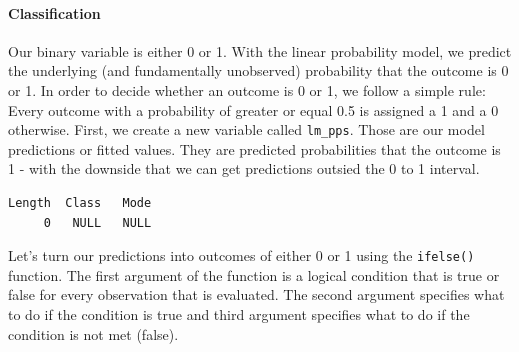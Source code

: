 \documentclass[]{article}
\newenvironment{Shaded}{\begin{snugshade}}{\end{snugshade}}
\newcommand{\KeywordTok}[1]{\textcolor[rgb]{0.13,0.29,0.53}{\textbf{#1}}}
\newcommand{\DataTypeTok}[1]{\textcolor[rgb]{0.13,0.29,0.53}{#1}}
\newcommand{\DecValTok}[1]{\textcolor[rgb]{0.00,0.00,0.81}{#1}}
\newcommand{\FloatTok}[1]{\textcolor[rgb]{0.00,0.00,0.81}{#1}}
\newcommand{\StringTok}[1]{\textcolor[rgb]{0.31,0.60,0.02}{#1}}
\newcommand{\CommentTok}[1]{\textcolor[rgb]{0.56,0.35,0.01}{\textit{#1}}}
\newcommand{\OperatorTok}[1]{\textcolor[rgb]{0.81,0.36,0.00}{\textbf{#1}}}
\newcommand{\NormalTok}[1]{#1}
\let\oldparagraph\paragraph
\renewcommand{\paragraph}[1]{\oldparagraph{#1}\mbox{}}
\theoremstyle{definition}
\theoremstyle{definition}
\theoremstyle{definition}
\theoremstyle{remark}
\begin{document}
\paragraph{Classification}\label{classification}

Our binary variable is either 0 or 1. With the linear probability model,
we predict the underlying (and fundamentally unobserved) probability
that the outcome is 0 or 1. In order to decide whether an outcome is 0
or 1, we follow a simple rule: Every outcome with a probability of
greater or equal 0.5 is assigned a 1 and a 0 otherwise. First, we create
a new variable called \texttt{lm\_pps}. Those are our model predictions
or fitted values. They are predicted probabilities that the outcome is 1
- with the downside that we can get predictions outsied the 0 to 1
interval.

\begin{Shaded}
\end{Shaded}

\begin{verbatim}
Length  Class   Mode 
     0   NULL   NULL 
\end{verbatim}

Let's turn our predictions into outcomes of either 0 or 1 using the
\texttt{ifelse()} function. The first argument of the function is a
logical condition that is true or false for every observation that is
evaluated. The second argument specifies what to do if the condition is
true and third argument specifies what to do if the condition is not met
(false).

\begin{Shaded}
\end{Shaded}
\end{document}

